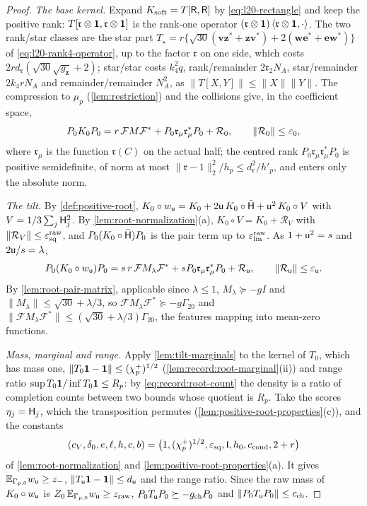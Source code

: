 \begin{proof}
\emph{The base kernel.} Expand $K_{\rm soft}=T[\mathsf R,\mathsf R]$ by \eqref{eq:l20-rectangle}
and keep the positive rank: $T[\mathfrak r\otimes\mathbf 1,\mathfrak r\otimes\mathbf 1]$ is the rank-one
operator $(\mathfrak r\otimes\mathbf 1)\left\langle \mathfrak r\otimes\mathbf 1,\cdot\right\rangle$. The two rank/star classes
are the star part $T_\star=r\{\sqrt{30}(\mathbf v\mathbf z^*+\mathbf z\mathbf v^*)
+2(\mathbf w\mathbf e^*+\mathbf e\mathbf w^*)\}$ of \eqref{eq:l20-rank4-operator}, up to the
factor $\mathfrak r$ on one side, which costs $2rd_{\mathfrak r}(\sqrt{30}\sqrt{g_{\mathbf z}}+2)$;
star/star costs $k_4^2q$, rank/remainder $2\mathfrak r_2N_A$, star/remainder $2k_4rN_A$ and
remainder/remainder $N_A^2$, as $\|T[X,Y]\|\le\|X\|\|Y\|$. The compression to $\mu_p$
(\cref{lem:restriction}) and the collisions give, in the coefficient space,
\[
 P_0K_0P_0=r\,\mathcal FM\mathcal F^*+P_0\mathfrak r_\mu\mathfrak r_\mu^*P_0+\mathcal R_0,
 \qquad\|\mathcal R_0\|\le\varepsilon_0,
\]
where $\mathfrak r_\mu$ is the function $\mathfrak r(C)$ on the actual half; the centred rank
$P_0\mathfrak r_\mu\mathfrak r_\mu^*P_0$ is positive semidefinite, of norm at most
$\|\mathfrak r-1\|_2^2/h_p\le d_{\mathfrak r}^2/h'_p$, and enters only the absolute norm.

\emph{The tilt.} By \cref{def:positive-root},
$K_0\circ w_\mathsf u=K_0+2\mathsf u\,K_0\circ\bar{\mathsf H}+\mathsf u^2\,K_0\circ V$
with $V=1/3\sum_j\mathsf H_{j}^2$. By \cref{lem:root-normalization}(a),
$K_0\circ V=K_0+\mathcal R_V$ with
$\|\mathcal R_V\|\le\varepsilon^{\rm raw}_{\rm sq}$, and $P_0(K_0\circ\bar{\mathsf H})P_0$ is the pair
term up to $\varepsilon^{\rm raw}_{\rm lin}$. As $1+\mathsf u^2=s$ and $2\mathsf u/s=\lambda$,
\[
 P_0(K_0\circ w_\mathsf u)P_0=s\,r\,\mathcal FM_\lambda\mathcal F^*
 +sP_0\mathfrak r_\mu\mathfrak r_\mu^*P_0+\mathcal R_\mathsf u,\qquad\|\mathcal R_\mathsf u\|\le\varepsilon_\mathsf u .
\]
By \cref{lem:root-pair-matrix}, applicable since $\lambda\le1$,
$M_\lambda\succeq-gI$ and $\|M_\lambda\|\le\sqrt{30}+\lambda/3$, so
$\mathcal FM_\lambda\mathcal F^*\succeq-g\Gamma_{20}$ and
$\|\mathcal FM_\lambda\mathcal F^*\|\le(\sqrt{30}+\lambda/3)\Gamma_{20}$, the features mapping into
mean-zero functions.

\emph{Mass, marginal and range.} Apply \cref{lem:tilt-marginals} to the kernel of $T_0$,
which has mass one, $\|T_0\mathbf 1-\mathbf 1\|\le(\chi^+_p)^{1/2}$
(\cref{lem:record:root-marginal}(ii)) and range ratio $\sup T_0\mathbf 1/\inf T_0\mathbf 1\le R_p$: by
\eqref{eq:record:root-count} the density is a ratio of completion counts between two
bounds whose quotient is $R_p$. Take the scores $\eta_j=\mathsf H_{j}$, which the transposition
permutes (\cref{lem:positive-root-properties}(c)), and the constants
\[
 (c_V,\delta_0,e,\ell,h,c,b)=\bigl(1,(\chi^+_p)^{1/2},\varepsilon_{\rm sq},\mathfrak l,
 h_0,c_{\rm cond},2+r\bigr)
\]
of \cref{lem:root-normalization} and
\cref{lem:positive-root-properties}(a). It gives $\mathbb E_{\Gamma_{p,0}}w_\mathsf u\ge z_-$,
$\|T_\mathsf u\mathbf 1-\mathbf 1\|\le d_\mathsf u$ and the range ratio. Since the raw mass of
$K_0\circ w_\mathsf u$ is $Z_0\,\mathbb E_{\Gamma_{p,0}}w_\mathsf u\ge z_{\rm raw}$,
$P_0T_\mathsf u P_0\succeq-g_{\rm ch}P_0$ and $\|P_0T_\mathsf u P_0\|\le c_{\rm ch}$.


\end{proof}
